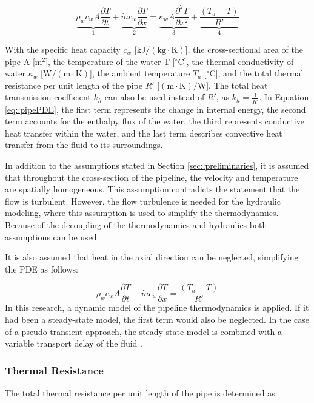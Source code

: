 \begin{equation}\label{eq::pipePDE}
\underbrace{\rho_w c_w A \frac{\partial T}{\partial t}}_1+\underbrace{\dot{m} c_w \frac{\partial T}{\partial x}}_2=\underbrace{\kappa_w A \frac{\partial^2 T}{\partial x^2}}_3+\underbrace{\frac{\left(T_a-T\right)}{R'}}_4
\end{equation}

With the specific heat capacity $c_w$ [$\mathrm{kJ} / (\mathrm{kg} \cdot \mathrm{K})$], the cross-sectional area of the pipe A [m$^2$], the temperature of the water T [$^{\circ}\text{C}$], the thermal conductivity of water $\kappa_w$ [$\mathrm{W} / \mathrm{(m \cdot K)}$], the ambient temperature $T_a$ [$^{\circ}\text{C}$], and the total thermal resistance per unit length of the pipe $R'$ [$\mathrm{(m \cdot K)} / \mathrm{W}$]. The total heat transmission coefficient $k_h$ can also be used instead of $R'$, as $k_h = \frac{1}{R'}$. 
In Equation \ref{eq::pipePDE}, the first term represents the change in internal energy, the second term accounts for the enthalpy flux of the water, the third represents conductive heat transfer within the water, and the last term describes convective heat transfer from the fluid to its surroundings.

In addition to the assumptions stated in Section \ref{sec::preliminaries}, it is assumed that throughout the cross-section of the pipeline, the velocity and temperature are spatially homogeneous. This assumption contradicts the statement that the flow is turbulent. However, the flow turbulence is needed for the hydraulic modeling, where this assumption is used to simplify the thermodynamics. Because of the decoupling of the thermodynamics and hydraulics both assumptions can be used. 

It is also assumed that heat in the axial direction can be neglected, simplifying the PDE as follows:

\begin{equation}\label{eq::simpipePDE}
\rho_w c_w A \frac{\partial T}{\partial t} + \dot{m} c_w \frac{\partial T}{\partial x}=\frac{\left(T_a-T\right)}{R'}
\end{equation}
In this research, a dynamic model of the pipeline thermodynamics is applied. If it had been a steady-state model, the first term would also be neglected. In the case of a pseudo-transient approach, the steady-state model is combined with a variable transport delay of the fluid \cite{PipePDE}.

\subsubsection{Thermal Resistance}
The total thermal resistance per unit length of the pipe is determined as: 


